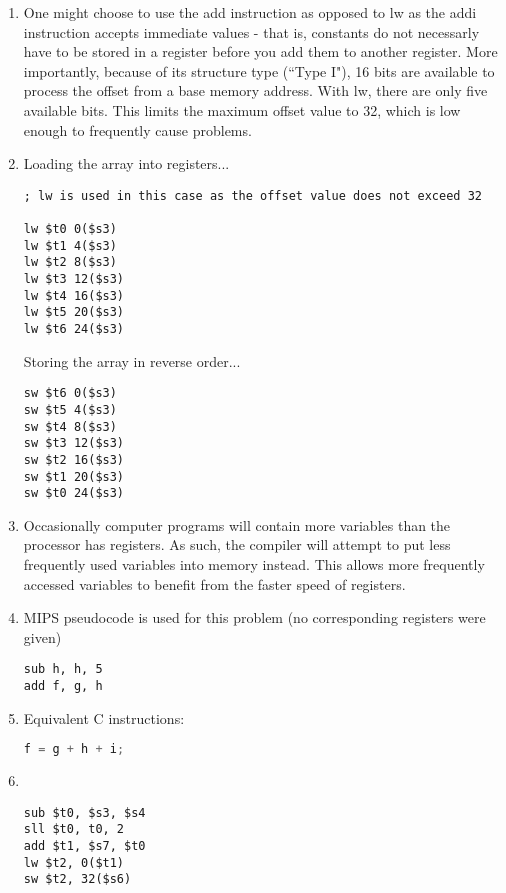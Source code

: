 \documentclass{3330hw}
\begin{document}
\maketitle
	
\begin{enumerate}
\item One might choose to use the add instruction as opposed to lw as the addi instruction accepts immediate values - that is, constants do not necessarly have to be stored in a register before you add them to another register. More importantly, because of its structure type (``Type I"), 16 bits are available to process the offset from a base memory address. With lw, there are only five available bits. This limits the maximum offset value to 32, which is low enough to frequently cause problems. 

\item Loading the array into registers...
\begin{lstlisting}
; lw is used in this case as the offset value does not exceed 32

lw $t0 0($s3)
lw $t1 4($s3)
lw $t2 8($s3)
lw $t3 12($s3)
lw $t4 16($s3)
lw $t5 20($s3)
lw $t6 24($s3)
\end{lstlisting}
Storing the array in reverse order...
\begin{lstlisting}
sw $t6 0($s3)
sw $t5 4($s3)
sw $t4 8($s3)
sw $t3 12($s3)
sw $t2 16($s3)
sw $t1 20($s3)
sw $t0 24($s3)
\end{lstlisting}


\item Occasionally computer programs will contain more variables than the processor has registers. As such, the compiler will attempt to put less frequently used variables into memory instead. This allows more frequently accessed variables to benefit from the faster speed of registers.

\item MIPS pseudocode is used for this problem (no corresponding registers were given)
\begin{lstlisting}
sub h, h, 5
add f, g, h
\end{lstlisting}

\item Equivalent C instructions:
\begin{lstlisting}[language=c]
f = g + h + i;
\end{lstlisting}

\item~
\begin{lstlisting}
sub $t0, $s3, $s4
sll $t0, t0, 2		
add $t1, $s7, $t0   
lw $t2, 0($t1)      
sw $t2, 32($s6)     
\end{lstlisting}



\end{enumerate}
\end{document}
